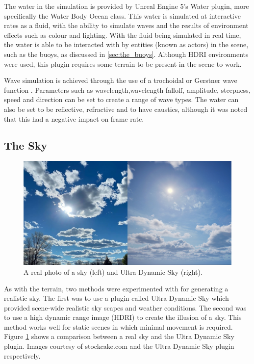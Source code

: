 \documentclass[10pt,twocolumn,letterpaper]{article}
\begin{document}
The water in the simulation is provided by Unreal Engine 5's Water plugin, more specifically the Water Body Ocean class. This water is simulated at interactive rates as a fluid, with the ability to simulate waves and the results of environment effects such as colour and lighting. With the fluid being simulated in real time, the water is able to be interacted with by entities (known as actors) in the scene, such as the buoys, as discussed in \ref{sec:the_buoys}. Although HDRI environments were used, this plugin requires some terrain to be present in the scene to work.

Wave simulation is achieved through the use of a trochoidal or Gerstner wave function \cite{constantin2017gerstner}. Parameters such as wavelength,wavelength falloff, amplitude, steepness, speed and direction can be set to create a range of wave types. The water can also be set to be reflective, refractive and to have caustics, although it was noted that this had a negative impact on frame rate. 

\subsection{The Sky}

\begin{figure}[t]
    \centering
    \includegraphics[width=\linewidth]{images/sky_comparison.png}
    \caption{A real photo of a sky (left) and Ultra Dynamic Sky (right).}
    \label{fig:sky_comparison}
\end{figure}

As with the terrain, two methods were experimented with for generating a realistic sky. The first was to use a plugin called Ultra Dynamic Sky \cite{UltraDynamicSky} which provided scene-wide realistic sky scapes and weather conditions. The second was to use a high dynamic range image (HDRI) to create the illusion of a sky. This method works well for static scenes in which minimal movement is required. Figure \ref{fig:sky_comparison} shows a comparison between a real sky and the Ultra Dynamic Sky plugin. Images courtesy of stockcake.com \cite{StockCake2025} and the Ultra Dynamic Sky plugin respectively.
\end{document}
